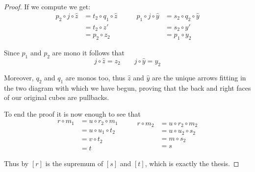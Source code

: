 \begin{proof}
	If we compute we get:
	\[\begin{split}
		p_2\circ j\circ \hat{z}&= t_2\circ q_1\circ \hat{z}\\&=t_2\circ z'\\&= p_2\circ z_2
	\end{split}\qquad \begin{split}
	p_1\circ j \circ \hat{y}&=s_2\circ q_2\circ \hat{y}\\&=s_2\circ y'\\&=p_1\circ y_2
	\end{split}\]
	
	Since $p_1$ and $p_2$ are mono it follows that 
	\[j\circ \hat{z}=z_2 \qquad j\circ \hat{y}=y_2\]
		
	Moreover, $q_2$ and $q_1$  are monos too, thus $\hat{z}$ and $\hat{y}$ are the unique arrows fitting in the two diagram with which we have begun, proving that the back and right faces of our original cubes are pullbacks.
	
	To end the proof it is now enough to see that 
	\[\begin{split}
	r\circ m_1&=u\circ r_2\circ m_1\\&=u\circ u_1\circ t_2\\&=v\circ t_2\\&=t
	\end{split}\qquad \begin{split}
	r\circ m_2&=u\circ r_2\circ m_2\\&=u\circ u_2\circ s_2\\&=m\circ s_2\\&=s
	\end{split}\]

Thus by  $[r]$ is the supremum of $[s]$ and $[t]$, which is exactly the thesis.	
\end{proof}





